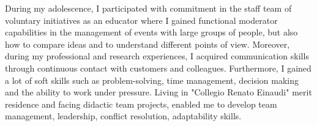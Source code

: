 {\begin{cvskills}


\end{cvskills}
\vspace{-5mm}
\begin{cvparagraph}
  During my adolescence, I participated with commitment in the staff team of voluntary initiatives as an educator where I gained functional moderator capabilities in the management of events with large groups of people, but also how to compare ideas and to understand different points of view. Moreover, during my professional and research experiences, I acquired communication skills through continuous contact with customers and colleagues. Furthermore, I gained a lot of soft skills such as problem-solving, time management, decision making and the ability to work under pressure. Living in "Collegio Renato Einaudi" merit residence and facing didactic team projects, enabled me to develop team management, leadership, conflict resolution, adaptability skills.
\end{cvparagraph}
}
